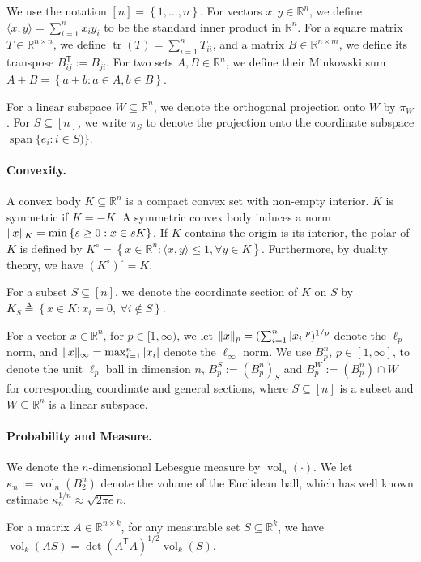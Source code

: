 \documentclass[11pt]{article}
\newcommand{\R}{{\mathbb{R}}}
\newcommand{\T}{\mathsf T}
\newcommand{\eqdef}{\triangleq}
\newcommand{\inner}[2]{\langle #1, #2 \rangle}
\newcommand{\set}[1]{\left\{ #1 \right\}}
\DeclareMathOperator{\vol}{vol}
\DeclareMathOperator{\lspan}{span}
\DeclareMathOperator{\tr}{tr}
\DeclarePairedDelimiter\norm{\lVert}{\rVert}
\begin{document}
We use the notation $[n] = \set{1,\dots,n}$. For vectors $x,y \in \R^n$, we
define $\inner{x}{y} = \sum_{i=1}^n x_i y_i$ to be the standard inner product in
$\R^n$. For a square matrix $T \in \R^{n \times n}$, we define $\tr(T) =
\sum_{i=1}^n T_{ii}$, and a matrix $B \in \R^{n \times m}$, we define its
transpose $B^\T_{ij} := B_{ji}$. For two sets $A,B \in \R^n$, we define their
Minkowski sum $A+B = \set{a+b: a \in A,b \in B}$.

For a linear subspace $W \subseteq \R^n$, we denote the orthogonal projection
onto $W$ by $\pi_W$. For $S \subseteq [n]$, we write $\pi_S$ to denote the
projection onto the coordinate subspace $\lspan\{e_i: i \in S)\}$.

\paragraph{\bf Convexity.} A convex body $K \subseteq \R^n$ is a compact convex
set with non-empty interior. $K$ is symmetric if $K = -K$. A symmetric convex
body induces a norm $\norm{x}_K = \min \set{s \geq 0: x \in sK}$. If $K$
contains the origin is its interior, the polar of $K$ is defined by $K^\circ =
\set{x \in \R^n: \inner{x}{y} \leq 1, \forall y \in K}$. Furthermore, by duality
theory, we have $(K^{\circ})^\circ = K$. 

For a subset $S \subseteq [n]$, we denote the coordinate section of $K$ on $S$
by $K_S \eqdef \set{x \in K: x_i = 0, ~\forall i \notin S}$. 

For a vector $x \in \R^n$, for $p \in [1,\infty)$, we let $\norm{x}_p =
(\sum_{i=1}^n |x_i|^p)^{1/p}$ denote the $\ell_p$ norm, and $\norm{x}_\infty =
\max_{i=1}^n |x_i|$ denote the $\ell_\infty$ norm. We use $B_p^n$, $p \in
[1,\infty]$, to denote the unit $\ell_p$ ball in dimension $n$, $B_p^S :=
(B_p^n)_S$ and $B_p^W := (B_p^n) \cap W$ for corresponding coordinate and
general sections, where $S \subseteq [n]$ is a subset and $W \subseteq \R^n$ is
a linear subspace. 

\paragraph{\bf Probability and Measure.} We denote the $n$-dimensional Lebesgue
measure by $\vol_n(\cdot)$. We let $\kappa_n := \vol_n(B_2^n)$ denote the volume
of the Euclidean ball, which has well known estimate $\kappa_n^{1/n} \approx
\sqrt{2\pi e}{n}$. 

For a matrix $A \in \R^{n \times k}$, for any measurable set $S \subseteq \R^k$,
we have $\vol_k(A S) = \det(A^\T A)^{1/2} \vol_k(S)$.  
\end{document}
